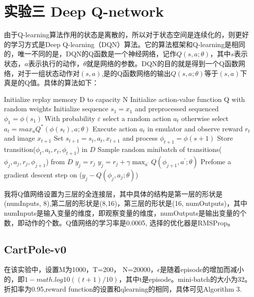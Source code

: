 \documentclass[a4paper,UTF8]{article}
\theoremstyle{definition}
\begin{document}
\section*{实验三 Deep Q-network}
	由于Q-learning算法作用的状态是离散的，所以对于状态空间是连续化的，则更好的学习方式是Deep Q-learning（DQN）算法。它的算法框架和Q-learning是相同的，唯一不同的是，DQN的Q函数是一个神经网络，记作$Q(s,a;\theta)$，其中$s$表示状态，$a$表示执行的动作，$\theta$就是网络的参数。DQN的目的就是得到一个Q函数网络，对于一组状态动作对$(s,a)$,是的Q函数网络的输出$Q(s,a;\theta)$等于$(s,a)$下真是的Q值。具体的算法\cite{mnih2013playing}如下：

\begin{algorithm}

\begin{algorithmic}[1]
\State Initialize replay memory D to capacity N
\State Initialize action-value function Q with random weights
   Initialize sequence $s_1={x_1}$ and preprocessed sequenced $\phi_1=\phi(s_1)$
        \State With probability $\varepsilon$ select a random action $a_t$
        \State otherwise select $a_t = max_aQ^*(\phi(s_t),a;\theta)$
        \State Execute action $a_t$ in emulator and observe reward $r_t$ and image $x_{t+1}$
        \State Set $s_{t+1} = s_t, a_t, x_{t+1}$ and process $\phi_{t+1}=\phi(s+1)$
        \State Store transition($\phi_t, a_t, r_t, \phi_{t+1}$) in $D$
        \State Sample random minibatch of transitions($\phi_j, a_j, r_j, \phi_{j+1}$) from $D$
            \State $y_j = r_j$
        \Else
            \State $y_j=r_j+\gamma \max_{a^\prime}Q(\phi_{j+1},a^\prime;\theta)$
        \EndIf
        \State Prefome a gradient descent step on ($y_j-Q(\phi_j,a_j;\theta)$)
   \EndFor
\EndFor
\end{algorithmic}
\end{algorithm}

我将Q值网络设置为三层的全连接层，其中具体的结构是第一层的形状是(numInputs, 8),第二层的形状是(8,16)，第三层的形状是(16, numOutputs)，其中numInputs是输入变量的维度，即观察变量的维度，numOutputs是输出变量的个数，即动作的个数。Q值网络的学习率是0.0005, 选择的优化器是RMSProp。

\subsection*{CartPole-v0}

在该实验中，设置M为1000，T=200， N=20000，$\epsilon$是随着episode的增加而减小的，即$1-math.log10((t+1)/10)$，其中t是episode。mini-batch的大小为32。折扣率为0.95,reward function的设置和qlearning的相同，具体可见Algorithm 3.
\end{document}
